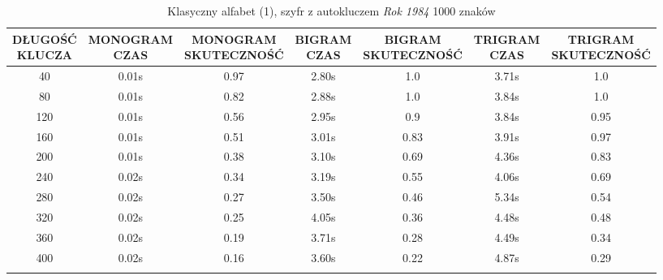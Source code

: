 \documentclass[a4paper]{article}
\theoremstyle{defn}
\theoremstyle{theorem}
\theoremstyle{lemma}
\theoremstyle{cor}
\theoremstyle{fact}
\begin{document}
\begin{center}\begin{small}\begin{longtable}{|c|c|c|c|c|c|c|} 
\hline \makecell{DŁUGOŚĆ\\KLUCZA} &  \makecell{MONOGRAM\\CZAS} & \makecell{MONOGRAM\\SKUTECZNOŚĆ} & \makecell{BIGRAM\\CZAS} &  \makecell{BIGRAM\\SKUTECZNOŚĆ} & \makecell{TRIGRAM\\CZAS} & \makecell{TRIGRAM\\SKUTECZNOŚĆ}\\ \hline 
40 & 0.01s & 0.97 & 2.80s & 1.0 & 3.71s & 1.0 \\ \hline 
80 & 0.01s & 0.82 & 2.88s & 1.0 & 3.84s & 1.0 \\ \hline 
120 & 0.01s & 0.56 & 2.95s & 0.9 & 3.84s & 0.95 \\ \hline 
160 & 0.01s & 0.51 & 3.01s & 0.83 & 3.91s & 0.97 \\ \hline 
200 & 0.01s & 0.38 & 3.10s & 0.69 & 4.36s & 0.83 \\ \hline 
240 & 0.02s & 0.34 & 3.19s & 0.55 & 4.06s & 0.69 \\ \hline 
280 & 0.02s & 0.27 & 3.50s & 0.46 & 5.34s & 0.54 \\ \hline 
320 & 0.02s & 0.25 & 4.05s & 0.36 & 4.48s & 0.48 \\ \hline 
360 & 0.02s & 0.19 & 3.71s & 0.28 & 4.49s & 0.34 \\ \hline 
400 & 0.02s & 0.16 & 3.60s & 0.22 & 4.87s & 0.29 \\ \hline 
\caption{Klasyczny alfabet (1), szyfr z autokluczem \textit{Rok 1984} 1000 znaków}
\end{longtable}\end{small}\end{center} 
\end{document}
